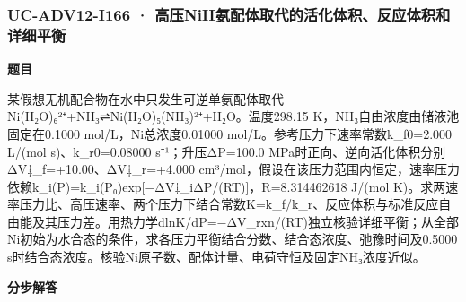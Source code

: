 \documentclass[UTF8,11pt,a4paper]{ctexart}
\begin{document}
\subsubsection*{UC-ADV12-I166 · 高压NiII氨配体取代的活化体积、反应体积和详细平衡}
\noindent\textbf{题目}\par
某假想无机配合物在水中只发生可逆单氨配体取代Ni(H₂O)₆²⁺+NH₃⇌Ni(H₂O)₅(NH₃)²⁺+H₂O。温度298.15 K，NH₃自由浓度由储液池固定在0.1000 mol/L，Ni总浓度0.01000 mol/L。参考压力下速率常数k\_f0=2.000 L/(mol s)、k\_r0=0.08000 s⁻¹；升压ΔP=100.0 MPa时正向、逆向活化体积分别ΔV‡\_f=+10.00、ΔV‡\_r=+4.000 cm³/mol，假设在该压力范围内恒定，速率压力依赖k\_i(P)=k\_i(P₀)exp[−ΔV‡\_iΔP/(RT)]，R=8.314462618 J/(mol K)。求两速率压力比、高压速率、两个压力下结合常数K=k\_f/k\_r、反应体积与标准反应自由能及其压力差。用热力学dlnK/dP=−ΔV\_rxn/(RT)独立核验详细平衡；从全部Ni初始为水合态的条件，求各压力平衡结合分数、结合态浓度、弛豫时间及0.5000 s时结合态浓度。核验Ni原子数、配体计量、电荷守恒及固定NH₃浓度近似。\par
\medskip\noindent\textbf{分步解答}
\end{document}
